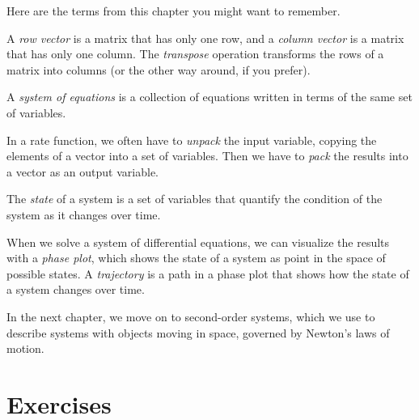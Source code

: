 Here are the terms from this chapter you might want to remember.

A {\em row vector} is a matrix that has only one row, and a {\em column vector} is a matrix that has only one column.
The {\em transpose} operation transforms the rows of a matrix
into columns (or the other way around, if you prefer).

A {\em system of equations} is a collection of equations written in terms of
the same set of variables.

In a rate function, we often have to {\em unpack} the input variable,
copying the elements of a vector into a set of variables.
Then we have to {\em pack} the results into a vector as an output variable.

The {\em state} of a system is a set of variables that quantify the condition of the system as it changes over time.

When we solve a system of differential equations, we can visualize the results with a {\em phase plot}, which shows the state of a system as point in the space of possible states.
A {\em trajectory} is a path in a phase plot that shows how the state of a system changes over time.

In the next chapter, we move on to second-order systems, which we use to describe systems
with objects moving in space, governed by Newton's laws of motion.


\section{Exercises}

